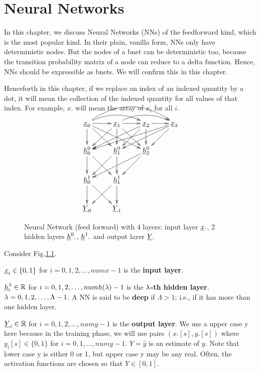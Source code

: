 \chapter{Neural Networks}\label{ch-nn}

In this chapter, we discuss
 Neural Networks (NNs) of the
feedforward kind,
which is the most popular kind. In their
 plain, vanilla form, NNs only
have deterministic nodes.
But the nodes of a bnet can
be deterministic too, because
the transition probability matrix
of a node
can reduce to a delta function.
Hence, NNs should be expressible
as bnets. We will confirm this
in this chapter.

Henceforth in this chapter,
if we replace an index of an
indexed quantity by a dot, 
it will mean the collection
of the indexed quantity
for all values of that
index. For example, $x.$
will mean the 
array of $x_i$ for all $i$.


\begin{figure}[h!]
\centering
$$\xymatrix{
\rvx_0\ar@/^1pc/[rr]
\ar@/^2pc/[rrr]
\ar[d]\ar[dr]\ar[drr]\ar[r]&
\rvx_1\ar@/^1pc/[rr]
 \ar[dl]\ar[d]\ar[dr]\ar[r]&
\rvx_2\ar[dll]\ar[dl]\ar[d]\ar[r]&
\rvx_3\ar[dlll]\ar[dll]\ar[dl]\\
\rvh_0^0\ar[d]\ar[dr]&
\rvh_1^0\ar[dl]\ar[d]&
\rvh_2^0\ar[dll]\ar[dl]\\
\rvh_0^1\ar[d]\ar[dr]&
\rvh_1^1\ar[dl]\ar[d]\\
\rvY_0&
\rvY_1
}$$
\caption{Neural Network (feed forward)
with 4 layers: input layer ${\underline{x}}.$,
2 hidden layers ${\underline{h}}^0.$,
${\underline{h}}^1.$ and
output layer ${\underline{Y}}.$ }
\label{fig-nn}
\end{figure}

Consider Fig.\ref{fig-nn}.

${\underline{x}}_i\in 
\{0,1\}$ for 
$i=0, 1, 2, \dots,numx-1$
is the \textbf{input layer}.

${\underline{h}}_i^\lambda\in { \mathbb{R}}$ for 
$i=0, 1, 2, \dots,numh(\lambda)-1$
is the $\lambda$\textbf{-th hidden layer}.
$\lambda=0, 1, 2, \ldots, \Lambda-1$.
A NN is said to be {\bf deep} if
$\Lambda>1$; i.e., if it has 
more than one hidden layer.

${\underline{Y}}_i\in { \mathbb{R}}$ for 
$i=0, 1, 2, \dots,numy-1$
is the \textbf{output layer}.
We use a upper case y
here because in the training phase,
we will use pairs $(x.[s],y.[s])$ where
$y_i[s]\in \{0,1\}$ 
for $i=0, 1, \ldots, numy-1$.
$Y=\hat{y}$
is an estimate of $y$.
Note that lower case y is 
either 0 or 1, 
but upper case y may be 
any real. Often, the
activation
functions are chosen so that
$Y\in[0,1]$. 
 

